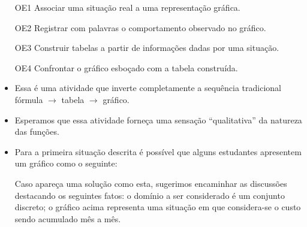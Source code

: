 \documentclass[10 pt,usenames,dvipsnames, oneside]{article}
\begin{document}
\begin{goals}
\begin{enumerate}

\item [OE1] Associar uma situação real a uma representação gráfica.

\item [OE2] Registrar com palavras o comportamento observado no gráfico.

\item [OE3] Construir tabelas a partir de informações dadas por uma situação.

\item [OE4] Confrontar o gráfico esboçado com a tabela construída.

\end{enumerate}

\tcblower

\begin{itemize}

\item Essa é uma atividade que inverte completamente a sequência tradicional fórmula $\rightarrow$
tabela $\rightarrow$ gráfico.
\item Esperamos que essa atividade forneça uma sensação “qualitativa” da natureza das
funções.

\item Para a primeira situação descrita é possível que alguns estudantes apresentem um
gráfico como o seguinte:

\begin{figure}[H]
\centering
{}
\end{figure}

Caso apareça uma solução como esta, sugerimos encaminhar as discussões destacando
os seguintes fatos: o domínio a ser considerado é um conjunto discreto; o gráfico acima
representa uma situação em que considera-se o custo sendo acumulado mês a mês.


\end{itemize}
\end{goals}
\end{document}
